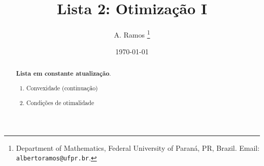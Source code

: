 \documentclass[a4paper,latin]{article}
\begin{document}
\title{Lista 2: Otimização I }

\author{
A. Ramos \thanks{Department of Mathematics,
    Federal University of Paraná, PR, Brazil.
    Email: {\tt albertoramos@ufpr.br}.}
}

\date{\today}
 
\maketitle

\begin{abstract}
{\bf Lista em constante atualização}.
 \begin{enumerate}
 \item Convexidade (continuação)
 \item Condições de otimalidade 
 \end{enumerate}
\end{abstract}
\end{document}
